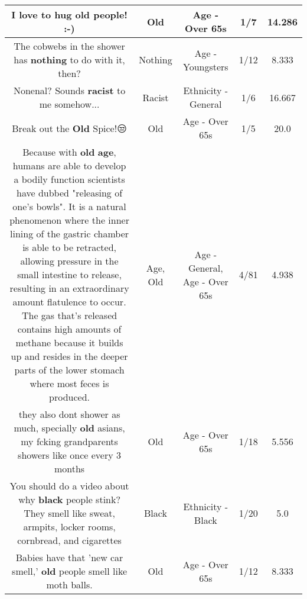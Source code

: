 \documentclass[11pt]{article}
\newlength\mylength
\begin{document}
\begin{center}
\begin{longtable}{|C{.65\mylength}|C{.30\mylength}|C{.12\mylength}|C{.12\mylength}|C{.12\mylength}|}
  \small I love to hug \textbf{old} people! :-)\normalsize   & Old & Age - Over 65s & 1/7 & 14.286 \\  \hline
  \small The cobwebs in the shower has \textbf{nothing} to do with it, then?\normalsize   & Nothing & Age - Youngsters & 1/12 & 8.333 \\  \hline
  \small Nonenal? Sounds \textbf{racist} to me somehow...\normalsize   & Racist & Ethnicity - General & 1/6 & 16.667 \\  \hline
  \small Break out the \textbf{Old} Spice!😒\normalsize   & Old & Age - Over 65s & 1/5 & 20.0 \\  \hline
  \small Because with \textbf{old} \textbf{age}, humans are able to develop a bodily function scientists have dubbed "releasing of one's bowls". It is a natural phenomenon where the inner lining of the gastric chamber is able to be retracted, allowing pressure in the small intestine to release, resulting in an extraordinary amount flatulence to occur. The gas that's released contains high amounts of methane because it builds up and resides in the deeper parts of the lower stomach where most feces is produced.\normalsize   & Age, Old & Age - General, Age - Over 65s & 4/81 & 4.938 \\  \hline
  \small they also dont shower as much, specially \textbf{old} asians, my fcking grandparents showers like once every 3 months\normalsize   & Old & Age - Over 65s & 1/18 & 5.556 \\  \hline
  \small You should do a video about why \textbf{black} people stink? They smell like sweat, armpits, locker rooms, cornbread, and cigarettes\normalsize   & Black & Ethnicity - Black & 1/20 & 5.0 \\  \hline
  \small Babies have that 'new car smell,' \textbf{old} people smell like moth balls.\normalsize   & Old & Age - Over 65s & 1/12 & 8.333 \\  \hline

\end{longtable}
\end{center}
\end{document}
